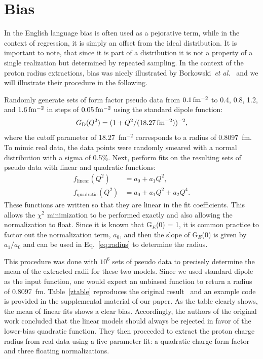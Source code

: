 \documentclass[10pt,aps,prc,twocolumn]{revtex4-1}
\begin{document}
\section{Bias}

In the English language bias is often used as a pejorative term, while in the context of regression, it is simply
an offset from the ideal distribution.   It is important to note, that since it is part of a distribution it
is not a property of a single realization but determined by repeated sampling.    In the context of the proton 
radius extractions, bias was nicely illustrated by Borkowski~{\it{et al.}}~\cite{Borkowski:1975} and we will
illustrate their procedure in the following.

Randomly generate sets of form factor pseudo data 
from $\unit[0.1]{fm^{-2}}$ to 0.4, 0.8, 1.2,
and $\unit[1.6]{fm^{-2}}$ 
in steps of $\unit[0.05]{fm^{-2}}$ 
using the standard dipole function:
\begin{equation}
\label{sd}
G\mathrm{_D}(Q^2) = ( 1 + Q^2/(\unit[18.27]{fm^{-2}}))^{-2},
\end{equation}
where the cutoff parameter of 18.27~fm$^{-2}$ corresponds to a radius of 0.8097~fm.
To mimic real data, the data points were randomly smeared with a normal distribution
with a sigma of 0.5\%.  
Next, perform fits on the resulting sets of pseudo data with linear and quadratic functions:
\begin{align}
f_{\mathrm{linear}}(Q^2) &  = a_0 + a_1 Q^2, \label{Eq:linear} \\
f_{\mathrm{quadratic}}(Q^2) & = a_0 + a_1 Q^2 + a_2 Q^4. \label{Eq:quadratic}
\end{align}
These functions are written so that they are linear in the fit coefficients.  
This allows the $\chi^2$ minimization to be performed exactly
and also allowing the normalization to float.   Since it is known that
G$_E$(0) = 1, it is common practice to factor out the normalization term, $a_0$, and 
then the slope of G$_E$(0) is given by $a_1/a_0$ and can be used in Eq.~\ref{eq:radius} 
to determine the radius.

This procedure was done with $10^6$ sets of pseudo data to 
precisely determine the mean of the extracted 
radii for these two models.   Since we used standard dipole as the input function, one would expect an unbiased 
function to return a radius of 0.8097~fm.
Table~\ref{ztable} reproduces the original result~\cite{Borkowski:1975} and
an example code is provided in the supplemental material of our paper.  
As the table clearly shows, the mean of linear fits shows a clear bias. 
Accordingly, the authors of the original work concluded that the linear models 
should always be rejected in favor of the lower-bias quadratic function.
They then proceeded to extract the proton charge radius from real data using a five parameter 
fit: a quadratic charge form factor and three floating normalizations.
\end{document}
